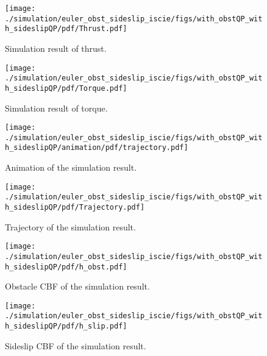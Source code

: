 \begin{figure}[t]
\centering
\texttt{[image: ./simulation/euler\_obst\_sideslip\_iscie/figs/with\_obstQP\_with\_sideslipQP/pdf/Thrust.pdf]}
\caption{Simulation result of thrust.}
\label{figs:simulation_result_of_thrust}
\end{figure}

\begin{figure}[t]
\centering
\texttt{[image: ./simulation/euler\_obst\_sideslip\_iscie/figs/with\_obstQP\_with\_sideslipQP/pdf/Torque.pdf]}
\caption{Simulation result of torque.}
\label{figs:simulation_result_of_torque}
\end{figure}


\begin{figure}[t]
  \centering
  \texttt{[image: ./simulation/euler\_obst\_sideslip\_iscie/figs/with\_obstQP\_with\_sideslipQP/animation/pdf/trajectory.pdf]}
  \caption{Animation of the simulation result.}
  \label{figs:animation_of_the_simulation_result}
\end{figure}

\begin{figure}[t]
  \centering
  \texttt{[image: ./simulation/euler\_obst\_sideslip\_iscie/figs/with\_obstQP\_with\_sideslipQP/pdf/Trajectory.pdf]}
  \caption{Trajectory of the simulation result.}
  \label{figs:trajectory_of_the_simulation_result}
\end{figure}

\begin{figure}[t]
\centering
\texttt{[image: ./simulation/euler\_obst\_sideslip\_iscie/figs/with\_obstQP\_with\_sideslipQP/pdf/h\_obst.pdf]}
\caption{Obstacle CBF of the simulation result.}
\label{figs:obstacle_CBF_of_the_simulation_result}
\end{figure}

\begin{figure}[t]
\centering
\texttt{[image: ./simulation/euler\_obst\_sideslip\_iscie/figs/with\_obstQP\_with\_sideslipQP/pdf/h\_slip.pdf]}
\caption{Sideslip CBF of the simulation result.}
\label{figs:sideslip_CBF_of_the_simulation_result}
\end{figure}

